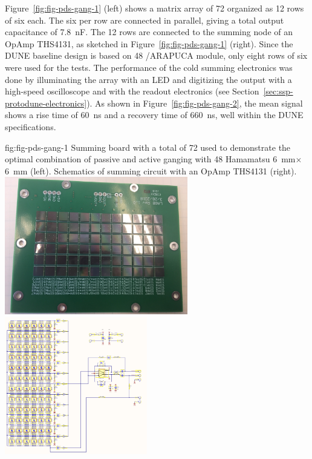 Figure~\ref{fig:fig-pds-gang-1} (left) shows a matrix array of 72  organized as 12 rows of six  each. 
The six  per row are connected in parallel, giving a total output capacitance of \SI{7.8}{nF}. The 12 rows are connected to the summing node of an OpAmp THS4131, as sketched in Figure~\ref{fig:fig-pds-gang-1} (right). 
Since the DUNE baseline design is based on 48 /ARAPUCA module, only eight rows of six were used for the tests. 
The performance of the cold summing electronics was done by illuminating the  array with an LED and digitizing the output with a high-speed oscilloscope and with the  readout electronics (see Section~\ref{sec:ssp-protodune-electronics}).
As shown in Figure~\ref{fig:fig-pds-gang-2}, the mean signal shows a rise time of \SI{60}{ns} and a recovery time of \SI{660}{ns}, well within the DUNE  specifications. %

\begin{dunefigure}
 {fig:fig-pds-gang-1}
 {Summing board with a total of 72  used to demonstrate the optimal combination of passive and active ganging with 48 Hamamatsu \SI{6}{mm}$\times$\SI{6}{mm}  (left).  Schematics of summing circuit with an OpAmp THS4131 (right).}
\includegraphics[height=6cm]{graphics/pds_gang_fig1.jpg}
\includegraphics[height=6cm]{graphics/pds_gang_fig2.png}
\end{dunefigure}

